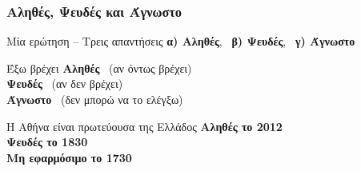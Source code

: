 \begin{frame}[t, fragile]
\frametitle{Αληθές, Ψευδές και Άγνωστο}
\begin{minipage}{\wE}
  \begin{block}{Μία ερώτηση -- Τρεις απαντήσεις}
    {\bf\color{green!50!black} α) Αληθές}, \, {\bf\color{red} β) Ψευδές}, \, {\bf γ) Άγνωστο}
  \end{block}
  \pause
  \begin{exampleblock}{Έξω βρέχει}
     {\bf\color{green!50!black} Αληθές} \, (αν όντως βρέχει) \\
     {\bf\color{red} Ψευδές} \, (αν δεν βρέχει) \\  
     {\bf Άγνωστο} \, (δεν μπορώ να το ελέγξω) \\       
  \end{exampleblock}
  \pause
  \begin{exampleblock}{Η Αθήνα είναι πρωτεύουσα της Ελλάδος}
     {\bf\color{green!50!black} Αληθές το 2012} \\
     {\bf\color{red} Ψευδές το 1830} \\  
     {\bf Μη εφαρμόσιμο το 1730} \\       
  \end{exampleblock}
\end{minipage}  
\end{frame}


